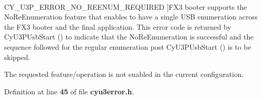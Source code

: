 $$\begin{Desc}
\begin{description}
{C\+Y\+\_\+\+U3\+P\+\_\+\+E\+R\+R\+O\+R\+\_\+\+N\+O\+\_\+\+R\+E\+E\+N\+U\+M\+\_\+\+R\+E\+Q\+U\+I\+R\+ED\label{cyu3error_8h_af668bfc4c39252082d2e9d4c221a9e12a628356834f1b0ea8c452b4cada6bb1cb}
}]F\+X3 booter supports the No\+Re\+Enumeration feature that enables to have a single U\+SB enumeration across the F\+X3 booter and the final application. This error code is returned by Cy\+U3\+P\+Usb\+Start () to indicate that the No\+Re\+Enumeration is successful and the sequence followed for the regular enumeration post Cy\+U3\+P\+Usb\+Start () is to be skipped. \item[{\em 
C\+Y\+\_\+\+U3\+P\+\_\+\+E\+R\+R\+O\+R\+\_\+\+O\+P\+E\+R\+N\+\_\+\+D\+I\+S\+A\+B\+L\+ED\label{cyu3error_8h_af668bfc4c39252082d2e9d4c221a9e12a2fa7645188a571e0c32e833ab4e2dac9}
}]The requested feature/operation is not enabled in the current configuration. \end{description}
\end{Desc}


Definition at line {\bf 45} of file {\bf cyu3error.\+h}.

